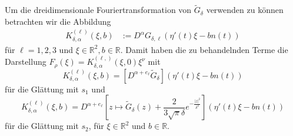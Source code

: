 \documentclass[12pt,a4paper]{scrartcl}
\newcommand{\dd}{\mathrm{d}}
\numberwithin{equation}{section}
\newcommand{\R}{\mathbb{R}} %
\begin{document}
Um die dreidimensionale Fouriertransformation von $\widetilde G_\delta$ verwenden zu können betrachten wir die Abbildung 
\begin{align*}
K_{\delta,\alpha}^{(\ell)}(\xi,b)
&:= D^\alpha G_{\delta,\ell}(\eta'(t) \xi - b n(t))
\end{align*}
für $\ell=1,2,3$ und  $\xi\in \R^2,b\in \R$. 
Damit haben die zu behandelnden Terme die Darstellung
$F_\rho(\xi) = K_{\delta,\alpha}^{(\ell,)}(\xi,0)\xi^\nu$ mit 
\[
K_{\delta,\alpha}^{(\ell)}(\xi,b)=[D^{\alpha+e_\ell}\widetilde{G}_\delta](\eta'(t) \xi - b n(t))
\]
für die Glättung mit $s_1$ und
\[
K_{\delta,\alpha}^{(\ell)}(\xi,b)=D^{\alpha+e_\ell}\left[z \mapsto \widetilde G_\delta(z) + \frac{2}{3 \sqrt{\pi} \delta } e^{-\frac{|z|^2}{\delta^2}}\right](\eta'(t) \xi - b n(t))
\]
für die Glättung mit $s_2$, für $\xi \in \R^2$ und $b \in \R$.
\end{document}
